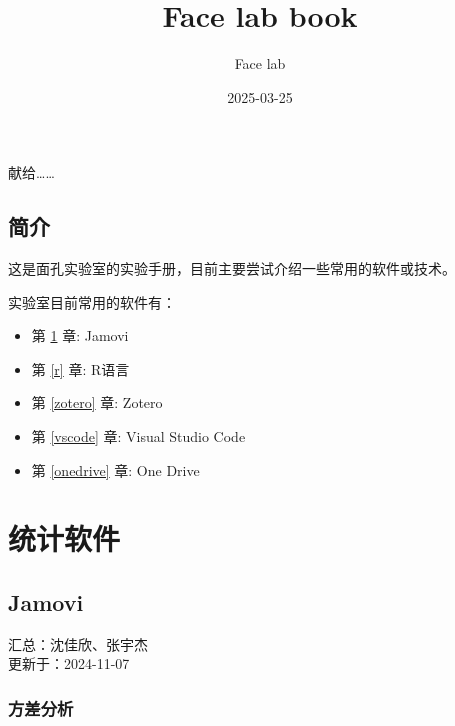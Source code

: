 \documentclass[]{ctexbook}
\title{Face lab book}
\author{Face lab}
\date{2025-03-25}
\providecommand{\tightlist}{%
  \setlength{\itemsep}{0pt}\setlength{\parskip}{0pt}}
\theoremstyle{definition}
\theoremstyle{definition}
\theoremstyle{definition}
\theoremstyle{definition}
\theoremstyle{remark}
\begin{document}
\maketitle


\thispagestyle{empty}

\begin{center}
献给……

\end{center}

\setlength{\abovedisplayskip}{-5pt}
\setlength{\abovedisplayshortskip}{-5pt}

{
\setcounter{tocdepth}{2}
\tableofcontents
}
\listoftables
\listoffigures
\chapter{简介}\label{ux7b80ux4ecb}

这是面孔实验室的实验手册，目前主要尝试介绍一些常用的软件或技术。

实验室目前常用的软件有：

\begin{itemize}
\tightlist
\item
  第 \ref{jamovi} 章: Jamovi\\
\item
  第 \ref{r} 章: R语言\\
\item
  第 \ref{zotero} 章: Zotero
\item
  第 \ref{vscode} 章: Visual Studio Code\\
\item
  第 \ref{onedrive} 章: One Drive
\end{itemize}

\mainmatter

\part{统计软件}\label{part-ux7edfux8ba1ux8f6fux4ef6}

\chapter{Jamovi}\label{jamovi}

汇总：沈佳欣、张宇杰\\
更新于：2024-11-07

\section{方差分析}\label{ux65b9ux5deeux5206ux6790}
\end{document}

